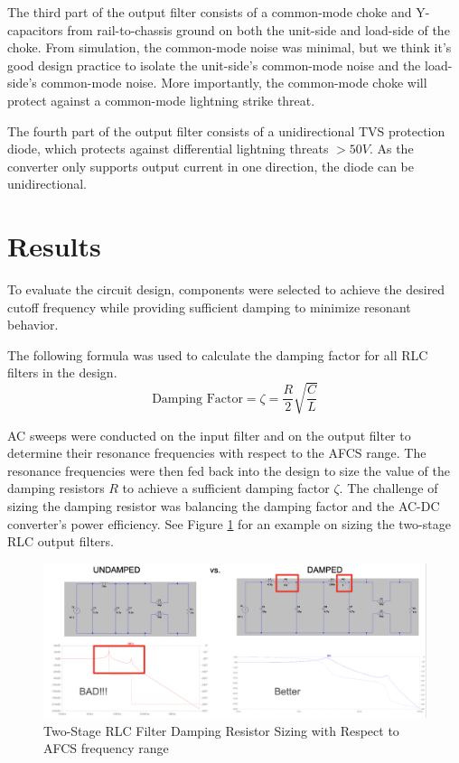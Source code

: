 \documentclass[conference]{IEEEtran}
\begin{document}
The third part of the output filter consists of a common-mode choke and Y-capacitors from rail-to-chassis ground on both the unit-side and load-side of the choke. From simulation, the common-mode noise was minimal, but we think it's good design practice to isolate the unit-side's common-mode noise and the load-side's common-mode noise. More importantly, the common-mode choke will protect against a common-mode lightning strike threat.

The fourth part of the output filter consists of a unidirectional TVS protection diode, which protects against differential lightning threats $>50V$. As the converter only supports output current in one direction, the diode can be unidirectional.

\FloatBarrier

\section{Results}
To evaluate the circuit design, components were selected to achieve the desired cutoff frequency while providing sufficient damping to minimize resonant behavior.

The following formula was used to calculate the damping factor for all RLC filters in the design.
$$ \text{Damping Factor} = \zeta = \frac{R}{2} \sqrt{\frac{C}{L}}$$

AC sweeps were conducted on the input filter and on the output filter to determine their resonance frequencies with respect to the AFCS range. The resonance frequencies were then fed back into the design to size the value of the damping resistors $R$ to achieve a sufficient damping factor $\zeta$. The challenge of sizing the damping resistor was balancing the damping factor and the AC-DC converter's power efficiency. See Figure \ref{fig:resonance_frequency_design_feedback_results_waveform} for an example on sizing the two-stage RLC output filters.

\begin{figure}[htp]
    \centering
    \includegraphics[width=1.0\linewidth]{resonance_frequency_design_feedback_results.png}
    \caption{Two-Stage RLC Filter Damping Resistor Sizing with Respect to AFCS frequency range}
    \label{fig:resonance_frequency_design_feedback_results_waveform}
\end{figure}
\end{document}
